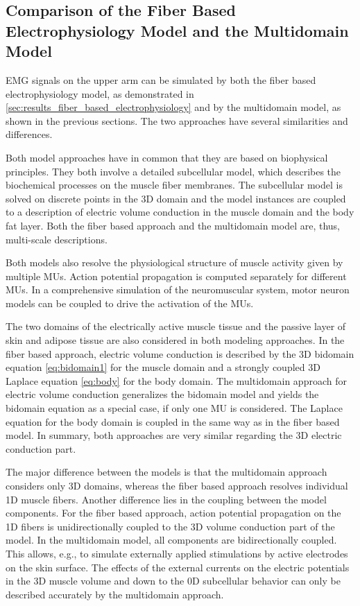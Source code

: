 \subsection{Comparison of the Fiber Based Electrophysiology Model and the Multidomain Model}\label{sec:multidomain_differences}

EMG signals on the upper arm can be simulated by both the fiber based electrophysiology model, as demonstrated in \cref{sec:results_fiber_based_electrophysiology} and by the multidomain model, as shown in the previous sections. The two approaches have several similarities and differences.

Both model approaches have in common that they are based on biophysical principles. They both involve a detailed subcellular model, which describes the biochemical processes on the muscle fiber membranes. The subcellular model is solved on discrete points in the 3D domain and the model instances are coupled to a description of electric volume conduction in the muscle domain and the body fat layer.  Both the fiber based approach and the multidomain model are, thus, multi-scale descriptions. 

Both models also resolve the physiological structure of muscle activity given by multiple MUs. Action potential propagation is computed separately for different MUs. In a comprehensive simulation of the neuromuscular system, motor neuron models can be coupled to drive the activation of the MUs.

The two domains of the electrically active muscle tissue and the passive layer of skin and adipose tissue are also considered in both modeling approaches. In the fiber based approach, electric volume conduction is described by the 3D bidomain equation \cref{eq:bidomain1} for the muscle domain and a strongly coupled 3D Laplace equation \cref{eq:body} for the body domain.
The multidomain approach for electric volume conduction generalizes the bidomain model and yields the bidomain equation as a special case, if only one MU is considered. The Laplace equation for the body domain is coupled in the same way as in the fiber based model. In summary, both approaches are very similar regarding the 3D electric conduction part.

The major difference between the models is that the multidomain approach considers only 3D domains, whereas the fiber based approach resolves individual 1D muscle fibers. Another difference lies in the coupling between the model components. For the fiber based approach, action potential propagation on the 1D fibers is unidirectionally coupled to the 3D volume conduction part of the model. In the multidomain model, all components are bidirectionally coupled. This allows, e.g., to simulate externally applied stimulations by active electrodes on the skin surface. The effects of the external currents on the electric potentials in the 3D muscle volume and down to the 0D subcellular behavior can only be described accurately by the multidomain approach.

